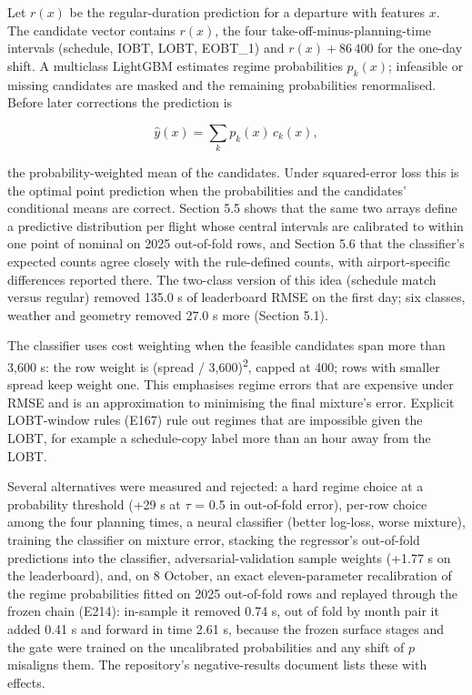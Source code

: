\documentclass[11pt,a4paper]{article}
\begin{document}
Let \(r(x)\) be the regular-duration prediction for a departure with features \(x\). The candidate vector contains \(r(x)\), the four take-off-minus-planning-time intervals (schedule, IOBT, LOBT, EOBT\_1) and \(r(x) + 86\,400\) for the one-day shift. A multiclass LightGBM \autocite{ke2017lightgbm} estimates regime probabilities \(p_k(x)\); infeasible or missing candidates are masked and the remaining probabilities renormalised. Before later corrections the prediction is

\begin{equation}\hat y(x) = \sum_k p_k(x)\, c_k(x),\end{equation}

the probability-weighted mean of the candidates. Under squared-error loss this is the optimal point prediction when the probabilities and the candidates' conditional means are correct. Section 5.5 shows that the same two arrays define a predictive distribution per flight whose central intervals are calibrated to within one point of nominal on 2025 out-of-fold rows, and Section 5.6 that the classifier's expected counts agree closely with the rule-defined counts, with airport-specific differences reported there. The two-class version of this idea (schedule match versus regular) removed 135.0 s of leaderboard RMSE on the first day; six classes, weather and geometry removed 27.0 s more (Section 5.1).

The classifier uses cost weighting when the feasible candidates span more than 3,600 s: the row weight is (spread / 3,600)\textsuperscript{2}, capped at 400; rows with smaller spread keep weight one. This emphasises regime errors that are expensive under RMSE and is an approximation to minimising the final mixture's error. Explicit LOBT-window rules (E167) rule out regimes that are impossible given the LOBT, for example a schedule-copy label more than an hour away from the LOBT.

Several alternatives were measured and rejected: a hard regime choice at a probability threshold (+29 s at $\tau$ = 0.5 in out-of-fold error), per-row choice among the four planning times, a neural classifier (better log-loss, worse mixture), training the classifier on mixture error, stacking the regressor's out-of-fold predictions into the classifier, adversarial-validation sample weights (+1.77 s on the leaderboard), and, on 8 October, an exact eleven-parameter recalibration of the regime probabilities fitted on 2025 out-of-fold rows and replayed through the frozen chain (E214): in-sample it removed 0.74 s, out of fold by month pair it added 0.41 s and forward in time 2.61 s, because the frozen surface stages and the gate were trained on the uncalibrated probabilities and any shift of \(p\) misaligns them. The repository's negative-results document lists these with effects.
\end{document}
